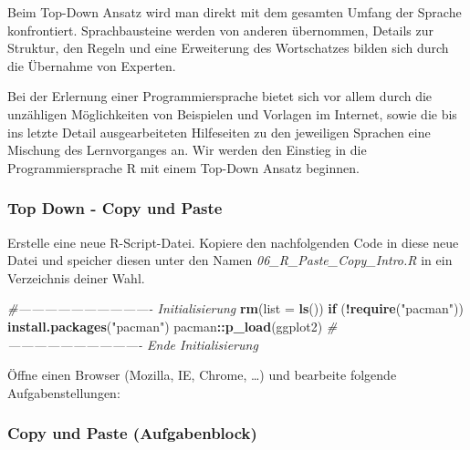 \documentclass[]{article}
\newenvironment{Shaded}{\begin{snugshade}}{\end{snugshade}}
\newcommand{\KeywordTok}[1]{\textcolor[rgb]{0.13,0.29,0.53}{\textbf{#1}}}
\newcommand{\DataTypeTok}[1]{\textcolor[rgb]{0.13,0.29,0.53}{#1}}
\newcommand{\StringTok}[1]{\textcolor[rgb]{0.31,0.60,0.02}{#1}}
\newcommand{\CommentTok}[1]{\textcolor[rgb]{0.56,0.35,0.01}{\textit{#1}}}
\newcommand{\ControlFlowTok}[1]{\textcolor[rgb]{0.13,0.29,0.53}{\textbf{#1}}}
\newcommand{\OperatorTok}[1]{\textcolor[rgb]{0.81,0.36,0.00}{\textbf{#1}}}
\newcommand{\NormalTok}[1]{#1}
\begin{document}
Beim Top-Down Ansatz wird man direkt mit dem gesamten Umfang der Sprache
konfrontiert. Sprachbausteine werden von anderen übernommen, Details zur
Struktur, den Regeln und eine Erweiterung des Wortschatzes bilden sich
durch die Übernahme von Experten.

Bei der Erlernung einer Programmiersprache bietet sich vor allem durch
die unzähligen Möglichkeiten von Beispielen und Vorlagen im Internet,
sowie die bis ins letzte Detail ausgearbeiteten Hilfeseiten zu den
jeweiligen Sprachen eine Mischung des Lernvorganges an. Wir werden den
Einstieg in die Programmiersprache R mit einem Top-Down Ansatz beginnen.

\subsubsection*{Top Down - Copy und
Paste}\label{top-down---copy-und-paste}

Erstelle eine neue R-Script-Datei. Kopiere den nachfolgenden Code in
diese neue Datei und speicher diesen unter den Namen
\emph{06\_R\_Paste\_Copy\_Intro.R} in ein Verzeichnis deiner Wahl.

\begin{Shaded}
\begin{Highlighting}[]
\CommentTok{#------------------------------- Initialisierung}
\KeywordTok{rm}\NormalTok{(}\DataTypeTok{list =} \KeywordTok{ls}\NormalTok{())}
\ControlFlowTok{if}\NormalTok{ (}\OperatorTok{!}\KeywordTok{require}\NormalTok{(}\StringTok{"pacman"}\NormalTok{)) }\KeywordTok{install.packages}\NormalTok{(}\StringTok{"pacman"}\NormalTok{)}
\NormalTok{pacman}\OperatorTok{::}\KeywordTok{p_load}\NormalTok{(ggplot2)}
\CommentTok{#------------------------------- Ende Initialisierung}
\end{Highlighting}
\end{Shaded}

Öffne einen Browser (Mozilla, IE, Chrome, \ldots{}) und bearbeite
folgende Aufgabenstellungen:

\subsubsection*{Copy und Paste
(Aufgabenblock)}\label{copy-und-paste-aufgabenblock}
\end{document}
